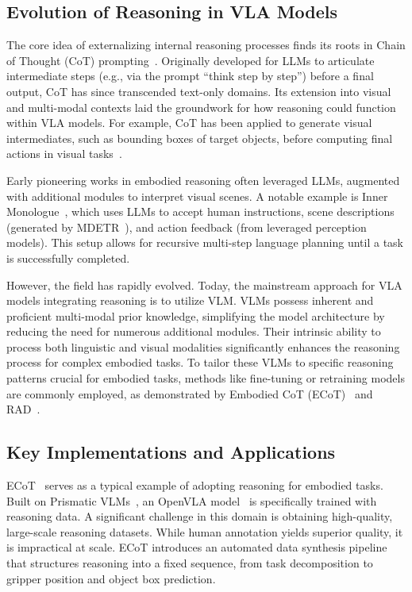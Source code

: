 \documentclass[10pt, a4paper, logo, copyright]{googledeepmind} %
\begin{document}
\subsection{Evolution of Reasoning in VLA Models}
The core idea of externalizing internal reasoning processes finds its roots in Chain of Thought (CoT) prompting~\citep{wei2022chain}. Originally developed for LLMs to articulate intermediate steps (e.g., via the prompt ``think step by step'') before a final output, CoT has since transcended text-only domains. Its extension into visual and multi-modal contexts laid the groundwork for how reasoning could function within VLA models. For example, CoT has been applied to generate visual intermediates, such as bounding boxes of target objects, before computing final actions in visual tasks~\citep{hao2024visualcot}.

Early pioneering works in embodied reasoning often leveraged LLMs, augmented with additional modules to interpret visual scenes. A notable example is Inner Monologue~\cite{huang2022inner}, which uses LLMs to accept human instructions, scene descriptions (generated by MDETR~\cite{kamath2021mdetr}), and action feedback (from leveraged perception models). This setup allows for recursive multi-step language planning until a task is successfully completed. 

However, the field has rapidly evolved. Today, the mainstream approach for VLA models integrating reasoning is to utilize VLM. VLMs possess inherent and proficient multi-modal prior knowledge, simplifying the model architecture by reducing the need for numerous additional modules. Their intrinsic ability to process both linguistic and visual modalities significantly enhances the reasoning process for complex embodied tasks. To tailor these VLMs to specific reasoning patterns crucial for embodied tasks, methods like fine-tuning or retraining models are commonly employed, as demonstrated by Embodied CoT (ECoT)~\cite{ECoT} and RAD~\cite{clark2025action}. 



\subsection{Key Implementations and Applications}

ECoT~\cite{ECoT} serves as a typical example of adopting reasoning for embodied tasks. Built on Prismatic VLMs~\cite{karamcheti2024prismatic}, an OpenVLA model~\cite{kim2024openvla} is specifically trained with reasoning data. A significant challenge in this domain is obtaining high-quality, large-scale reasoning datasets. While human annotation yields superior quality, it is impractical at scale. ECoT introduces an automated data synthesis pipeline that structures reasoning into a fixed sequence, from task decomposition to gripper position and object box prediction.
\end{document}
